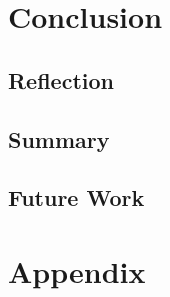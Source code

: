 \part{Conclusion}

\chapter{Reflection}


\chapter{Summary}


\chapter{Future Work}


\printbibliography

\part{Appendix}
\appendix


 
